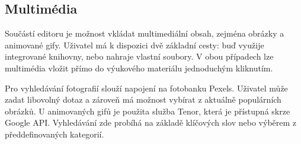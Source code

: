 

\subsection{Multimédia}

Součástí editoru je možnost vkládat multimediální obsah, zejména obrázky a animované gify.
Uživatel má k dispozici dvě základní cesty: buď využije integrované knihovny, nebo nahraje vlastní soubory. 
V obou případech lze multimédia vložit přímo do výukového materiálu jednoduchým kliknutím.

Pro vyhledávání fotografií slouží napojení na fotobanku Pexels. 
Uživatel může zadat libovolný dotaz a zároveň má možnost vybírat z aktuálně populárních obrázků. 
U animovaných gifů je použita služba Tenor, která je přístupná skrze Google API. 
Vyhledávání zde probíhá na základě klíčových slov nebo výběrem z předdefinovaných kategorií.

